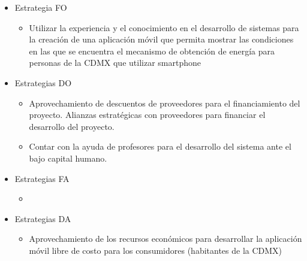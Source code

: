 \begin{itemize}
    \item Estrategia FO
    \begin{itemize}
         \item Utilizar la experiencia y el conocimiento en el desarrollo de sistemas para la creación de una aplicación móvil que permita mostrar las condiciones en las que se encuentra el mecanismo de obtención de energía para personas de la CDMX que utilizar smartphone
    \end{itemize}
    \item Estrategias DO
    \begin{itemize}
         \item Aprovechamiento de descuentos de proveedores para el financiamiento del proyecto. Alianzas estratégicas con proveedores para financiar el desarrollo del proyecto.
          \item Contar con la ayuda de profesores para el desarrollo del sistema ante el bajo capital humano.
    \end{itemize}
    \item Estrategias FA
     \begin{itemize}
        \item
    \end{itemize}
    \item Estrategias DA
     \begin{itemize}
         \item Aprovechamiento de los recursos económicos para desarrollar la aplicación móvil libre de costo para los consumidores (habitantes de la CDMX)
    \end{itemize}
\end{itemize}











